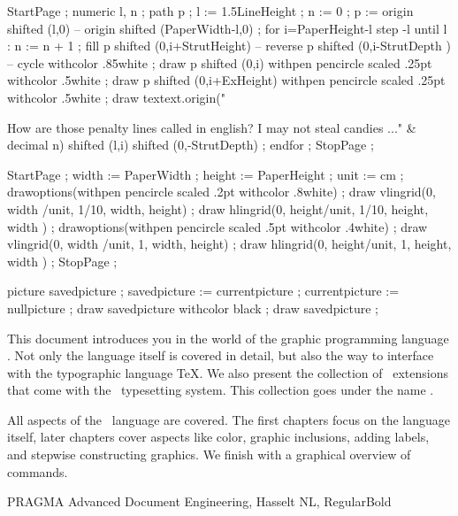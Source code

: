 \start \SomeHandwriting\setstrut

\startMPpage
  StartPage ;
    numeric l, n ; path p ;
    l := 1.5LineHeight ;
    n := 0 ;
    p := origin shifted (l,0) -- origin shifted (PaperWidth-l,0) ;
    for i=PaperHeight-l step -l until l :
      n := n + 1 ;
      fill         p shifted (0,i+StrutHeight) --
        reverse p shifted (0,i-StrutDepth ) -- cycle
        withcolor .85white ;
      draw p shifted (0,i)
        withpen pencircle scaled .25pt
        withcolor .5white ;
      draw p shifted (0,i+ExHeight)
        withpen pencircle scaled .25pt
        withcolor .5white ;
      draw textext.origin("\strut How are those penalty lines called
        in english? I may not steal candies ..." & decimal n)
          shifted (l,i)
          shifted (0,-StrutDepth) ;
    endfor ;
  StopPage ;
\stopMPpage
\stop
\stopbuffer

\startbuffer[gridpage]
\startMPpage
  StartPage ;
    width  := PaperWidth  ; height := PaperHeight ; unit := cm ;
    drawoptions(withpen pencircle scaled .2pt withcolor .8white) ;
    draw vlingrid(0, width /unit, 1/10, width,  height) ;
    draw hlingrid(0, height/unit, 1/10, height, width ) ;
    drawoptions(withpen pencircle scaled .5pt withcolor .4white) ;
    draw vlingrid(0, width /unit, 1,    width,  height) ;
    draw hlingrid(0, height/unit, 1,    height, width ) ;
  StopPage ;
\stopMPpage
\stopbuffer


\startmode[screen]

\startbuffer[wipe]
picture savedpicture ;
savedpicture := currentpicture ;
currentpicture := nullpicture ;
draw savedpicture withcolor black ;
draw savedpicture ;
\stopbuffer

\stopmode

\startnotmode[screen]

\startbuffer[wipe]
\stopbuffer

\stopnotmode

\startbuffer[backtext]

    This document introduces you in the world of the graphic programming language
    \MetaPost. Not only the language itself is covered in detail, but also the way to
    interface with the typographic language \TeX. We also present the collection of
    \MetaPost\ extensions that come with the \ConTeXt\ typesetting system. This
    collection goes under the name \MetaFun.

    \blank

    All aspects of the \MetaPost\ language are covered. The first chapters focus on
    the language itself, later chapters cover aspects like color, graphic
    inclusions, adding labels, and stepwise constructing graphics. We finish with a
    graphical overview of commands.

\stopbuffer

\startbuffer[backbanner]

  \WidthSpanningText
    {PRAGMA Advanced Document Engineering, Hasselt NL, \currentdate[year]}
    {\hsize}
    {RegularBold}

\stopbuffer

\stopenvironment
